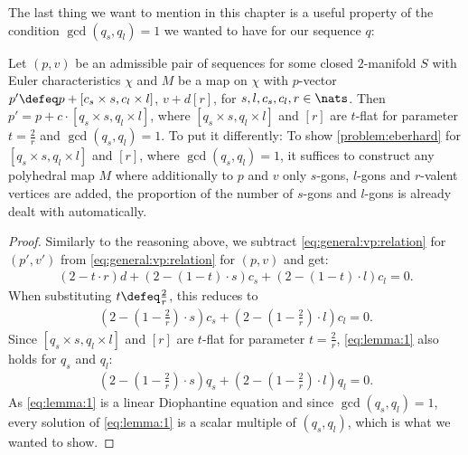 The last thing we want to mention in this chapter is a useful property of the condition $\gcd(q_s, q_l) = 1$ we wanted to have for our sequence $q$:

\begin{lemma}\label{lem:2:valued:eberhard}
  Let $(p, v)$ be an admissible pair of sequences for some closed $2$-manifold $S$ with {\sc Euler} characteristics $\chi$ and $M$ be a map on $\chi$ with $p$-vector $p' \defeq p + [c_s \times s, c_l \times l]$, $v + d [r]$, for $s, l, c_s, c_l, r \in \nats$. Then $p' = p + c \cdot [q_s \times s, q_l \times l]$, where $[q_s \times s, q_l \times l]$ and $[r]$ are $t$-flat for parameter $t = \tfrac{2}{r}$ and $\gcd(q_s, q_l) = 1$. To put it differently: To show \autoref{problem:eberhard} for $[q_s \times s, q_l \times l]$ and $[r]$, where $\gcd(q_s, q_l) = 1$, it suffices to construct any polyhedral map $M$ where additionally to $p$ and $v$ only $s$-gons, $l$-gons and $r$-valent vertices are added, the proportion of the number of $s$-gons and $l$-gons is already dealt with automatically.
  \begin{proof}
    Similarly to the reasoning above, we subtract \eqref{eq:general:vp:relation} for $(p', v')$ from \eqref{eq:general:vp:relation} for $(p, v)$ and get:
    \begin{align*}
      (2 - t \cdot r) d + (2 - (1 - t) \cdot s) c_s +  (2 - (1 - t) \cdot l) c_l = 0. 
    \end{align*}
    When substituting $t \defeq \tfrac{2}{r}$, this reduces to
    \begin{align}
      (2 - (1 - \tfrac{2}{r}) \cdot s) c_s + (2 - (1 - \tfrac{2}{r}) \cdot l) c_l = 0. \label{eq:lemma:1}
    \end{align}
    Since $[q_s \times s, q_l \times l]$ and $[r]$ are $t$-flat for parameter $t = \tfrac{2}{r}$, \eqref{eq:lemma:1} also holds for $q_s$ and $q_l$:
    \begin{align}
      (2 - (1 - \tfrac{2}{r}) \cdot s) q_s + (2 - (1 - \tfrac{2}{r}) \cdot l) q_l = 0.
    \end{align}
    As \eqref{eq:lemma:1} is a linear {\sc Diophantine} equation and since $\gcd(q_s, q_l) = 1$, every solution of \eqref{eq:lemma:1} is a scalar multiple of $(q_s, q_l)$, which is what we wanted to show.
  \end{proof}
\end{lemma}
